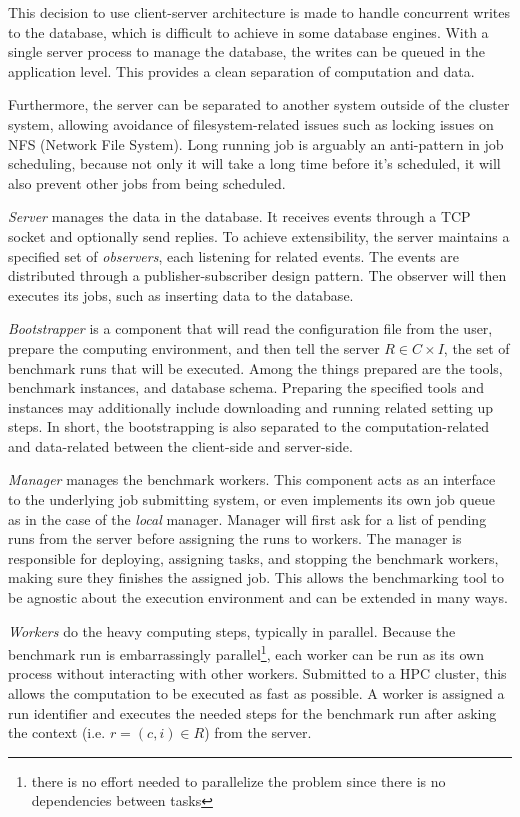 This decision to use client-server architecture is made to handle concurrent writes to the database, which is difficult to achieve in some database engines.
With a single server process to manage the database, the writes can be queued in the application level.
This provides a clean separation of computation and data.

Furthermore, the server can be separated to another system outside of the cluster system, allowing avoidance of filesystem-related issues such as locking issues on NFS (Network File System).
Long running job is arguably an anti-pattern in job scheduling, because not only it will take a long time before it's scheduled, it will also prevent other jobs from being scheduled.

\emph{Server} manages the data in the database.
It receives events through a TCP socket and optionally send replies.
To achieve extensibility, the server maintains a specified set of \emph{observers}, each listening for related events.
The events are distributed through a publisher-subscriber design pattern.
The observer will then executes its jobs, such as inserting data to the database.

\emph{Bootstrapper} is a component that will read the configuration file from the user, prepare the computing environment, and then tell the server $R \in C \times I$, the set of benchmark runs that will be executed.
Among the things prepared are the tools, benchmark instances, and database schema.
Preparing the specified tools and instances may additionally include downloading and running related setting up steps.
In short, the bootstrapping is also separated to the computation-related and data-related between the client-side and server-side.

\emph{Manager} manages the benchmark workers.
This component acts as an interface to the underlying job submitting system, or even implements its own job queue as in the case of the \emph{local} manager.
Manager will first ask for a list of pending runs from the server before assigning the runs to workers.
The manager is responsible for deploying, assigning tasks, and stopping the benchmark workers, making sure they finishes the assigned job.
This allows the benchmarking tool to be agnostic about the execution environment and can be extended in many ways.

\emph{Workers} do the heavy computing steps, typically in parallel.
Because the benchmark run is embarrassingly parallel\footnote{there is no effort needed to parallelize the problem since there is no dependencies between tasks}, each worker can be run as its own process without interacting with other workers.
Submitted to a HPC cluster, this allows the computation to be executed as fast as possible.
A worker is assigned a run identifier and executes the needed steps for the benchmark run after asking the context (i.e. $r = (c, i) \in R$) from the server.

